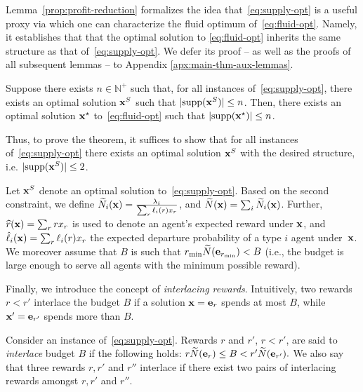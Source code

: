 \documentclass[12pt]{article}
\begin{document}
{Lemma~\ref{prop:profit-reduction} formalizes the idea that~\ref{eq:supply-opt} is a useful proxy via which one can characterize the fluid optimum of~\ref{eq:fluid-opt}. Namely, it establishes that that the optimal solution to \ref{eq:fluid-opt} inherits the same structure as that of~\ref{eq:supply-opt}. We defer its proof -- as well as the proofs of all subsequent lemmas -- to Appendix \ref{apx:main-thm-aux-lemmas}.}
\begin{lemma}\label{prop:profit-reduction}
Suppose there exists $n \in \mathbb{N}^+$ such that, for all instances of~\ref{eq:supply-opt}, there exists an optimal solution $\mathbf{x}^S$ such that $|\text{supp}(\normalfont{\mathbf{x}^S})| \leq n$. Then, there exists an optimal solution $\normalfont{\mathbf{x}}^\star$ to~\ref{eq:fluid-opt} such that $|\text{supp}(\normalfont{\mathbf{x}}^\star)| \leq n$. 
\end{lemma}

{Thus, to prove the theorem, it suffices to show {that for all instances of~\ref{eq:supply-opt}} there exists {an optimal solution $\mathbf{x}^S$ with the desired structure, i.e. $|\text{supp}(\normalfont{\mathbf{x}^S)}| \leq 2$.}}

Let $\mathbf{x}^S$ denote an optimal solution to~\ref{eq:supply-opt}. {Based on the second constraint}, we define $\widetilde{N}_i(\mathbf{x}) = \frac{\lambda_i}{\sum_r \ell_i(r)x_r}$, and $\widetilde{N}(\mathbf{x}) = \sum_i \widetilde{N}_i(\mathbf{x})$. {Further}, $\widehat{r}(\mathbf{x}) = \sum_r rx_r$ is used to denote {an agent's} expected reward under $\mathbf{x}$, and $\hat{\ell}_i(\mathbf{x}) = \sum_r \ell_i(r)x_r$ the expected departure probability of a type $i$ agent under~$\mathbf{x}$. {We moreover assume that $B$ is such that $r_{\min}\widetilde{N}(\mathbf{e}_{r_{\min}}) < B$ (i.e., the budget is large enough to serve all agents with the minimum possible reward).}

Finally, we introduce the concept of \emph{interlacing rewards}. {Intuitively, two rewards $r<r'$ {interlace} the budget $B$ if a solution $\mathbf{x}=\mathbf{e}_r$ spends at most $B$, while $\mathbf{x}'=\mathbf{e}_{r'}$ spends more than $B$.}



\begin{definition}
Consider an instance of~\ref{eq:supply-opt}. Rewards $r$ and $r'$, $r < r'$, are said to \emph{interlace} budget $B$ if the following holds:
$ {r \widetilde{N}(\mathbf{e}_{r}) \leq B < r'\widetilde{N}(\mathbf{e}_{r'}). }$
We also say that three rewards $r, r'$ and $r''$ interlace if there exist two pairs of interlacing rewards amongst $r, r'$ and $r''$.
\end{definition}
\end{document}
